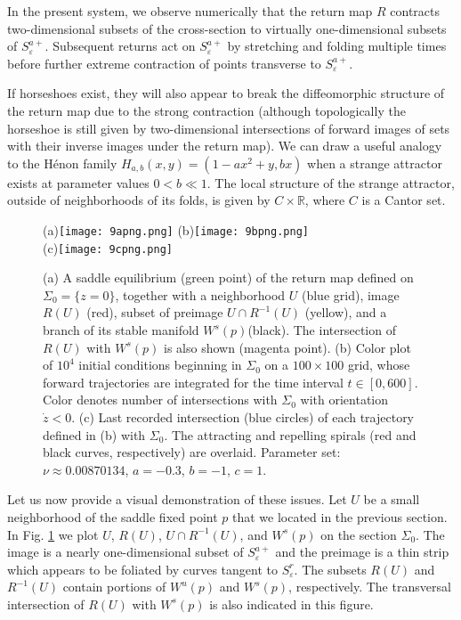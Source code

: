 \documentclass[aip, cha, sd, amsmath,amssymb, preprint]{revtex4-1}
\begin{document}
In the present system, we observe numerically that the return map $R$ contracts two-dimensional subsets of the cross-section to virtually one-dimensional subsets of $S^{a+}_{ \varepsilon}$. Subsequent returns act on $S^{a+}_{ \varepsilon}$ by stretching and folding multiple times before further extreme contraction of points transverse to $S^{a+}_{ \varepsilon}$. 

If horseshoes exist, they will also appear to break the diffeomorphic structure of the return map due to the strong contraction (although topologically the horseshoe is still given by two-dimensional intersections of forward images of sets with their inverse images under the return map). We can draw a useful analogy to the H\'enon family $H_{a,b}(x,y) = (1-ax^2+y,bx)$ when a strange attractor exists at parameter values $0 < b \ll 1$. The local structure of the strange attractor, outside of neighborhoods of its folds, is given by $C \times \mathbb{R}$, where $C$ is a Cantor set.

\begin{figure}
(a)\texttt{[image: 9apng.png]}
(b)\texttt{[image: 9bpng.png]}\\
(c)\texttt{[image: 9cpng.png]}
\caption{\label{fig:homorbit} (a) A saddle equilibrium (green point) of the return map defined on $\Sigma_0 = \{z = 0\}$, together with a neighborhood $U$ (blue grid), image $R(U)$ (red), subset of preimage $U \cap R^{-1}(U)$ (yellow), and a branch of its stable manifold $W^s(p)$(black). The intersection of $R(U)$ with $W^s(p)$ is also shown (magenta point). (b) Color plot of $10^4$ initial conditions beginning in $\Sigma_0$ on a $100\times 100$ grid, whose forward trajectories are integrated for the time interval $t \in [0,600]$. Color denotes number of intersections with $\Sigma_0$ with orientation $\dot{z} < 0$. (c) Last recorded intersection (blue circles) of each trajectory defined in (b) with $\Sigma_0$. The attracting and repelling spirals (red and black curves, respectively) are overlaid. Parameter set: $\nu \approx 0.00870134$, $a = -0.3$, $b = -1$, $c = 1$.}
\end{figure}

Let us now provide a visual demonstration of these issues. Let $U$ be a small neighborhood of the saddle fixed point $p$ that we located in the previous section. In Fig. \ref{fig:homorbit} we plot $U$, $R(U)$, $U\cap R^{-1}(U)$, and $W^s(p)$ on the section $\Sigma_0$. The image is a nearly one-dimensional subset of $S^{a+}_{ \varepsilon}$ and the preimage is a thin strip which appears to be foliated by curves tangent to $S^r_{ \varepsilon}$. The subsets $R(U)$ and $R^{-1}(U)$ contain portions of $W^u(p)$ and $W^s(p)$, respectively. The transversal intersection of $R(U)$ with $W^s(p)$ is also indicated in this figure.
\end{document}
